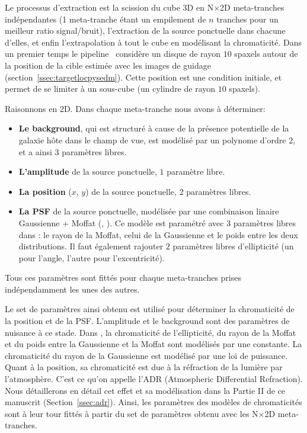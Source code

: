 \documentclass[../main/main.tex]{subfiles}
\begin{document}
Le processus d'extraction est la scission du cube 3D en N$\times$2D
meta-tranches indépendantes (1 meta-tranche étant un empilement de $n$
tranches pour un meilleur ratio signal/bruit), l'extraction de la source ponctuelle dans chacune
d'elles, et enfin l'extrapolation à tout le cube en modélisant la
chromaticité.
Dans un premier temps le pipeline \pysedm\ considère un disque de rayon $10$
spaxels autour de la position de la cible estimée avec les images de
guidage (section~\ref{ssec:targetlocpysedm}). Cette position est une
condition initiale, et permet de se limiter à un sous-cube (un cylindre
de rayon $10$ spaxels).

Raisonnons en 2D. Dans chaque meta-tranche nous avons à déterminer:
\begin{itemize}[label=$\bullet$]
\itemsep0em 
\item \textbf{Le background}, qui est structuré à cause de la
  présence potentielle de la galaxie hôte dans le champ de vue, est
  modélisé par un polynome d'ordre $2$, et a ainsi $3$ paramètres libres. 
\item \textbf{L'amplitude} de la source ponctuelle, $1$ paramètre libre.
\item \textbf{La position} ($x$, $y$) de la source ponctuelle, $2$ paramètres libres.
\item \textbf{La PSF} de la source ponctuelle, modélisée par une
  combinaison linaire Gaussienne + Moffat (\citet{Butonthese},
  \citet{Buton2013}). Ce modèle est paramétré avec $3$ paramètres libres
  dans \citet{pysedm}: le rayon de la Moffat, celui de la Gaussienne et
  le poids entre les deux distributions. Il faut également rajouter $2$ paramètres libres
  d'ellipticité (un pour l'angle, l'autre pour l'excentricité).
\end{itemize}

Tous ces paramètres sont fittés pour chaque meta-tranches prises
indépendamment les unes des autres.

Le set de paramètres ainsi obtenu est utilisé pour déterminer la
chromaticité de la position et de la PSF. L'amplitude et
le background sont des paramètres de nuisance à ce stade.
Dans \pysedm, la chromaticité de l'ellipticité, du rayon de la Moffat et du poids entre la
Gaussienne et la Moffat sont modélisés par une constante. La
chromaticité du rayon de la
Gaussienne est modélisé par une loi de puissance.
Quant à la position, sa chromaticité est due à la réfraction de la
lumière par l'atmosphère. C'est ce qu'on appelle l'ADR (Atmospheric
Differential Refraction). Nous détaillerons en détail cet effet et sa
modélisation dans la
Partie II de ce manuscrit (Section~\ref{ssec:adr}).
Ainsi, les paramètres des modèles de chromaticités sont à leur tour
fittés à partir du set de paramètres obtenu avec les N$\times$2D
meta-tranches.
\end{document}
